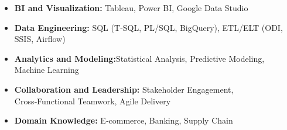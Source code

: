 \begin{itemize}[noitemsep, left=0pt]
    \item \textbf{BI and Visualization:} Tableau, Power BI, Google Data Studio
    \item \textbf{Data Engineering:} SQL (T‑SQL, PL/SQL, BigQuery), ETL/ELT (ODI, SSIS, Airflow)
    \item \textbf{Analytics and Modeling:}Statistical Analysis, Predictive Modeling, Machine Learning
    \item \textbf{Collaboration and Leadership:} Stakeholder Engagement, Cross‑Functional Teamwork, Agile Delivery
    \item \textbf{Domain Knowledge:} E‑commerce, Banking, Supply Chain
\end{itemize}
\vspace{-13pt}